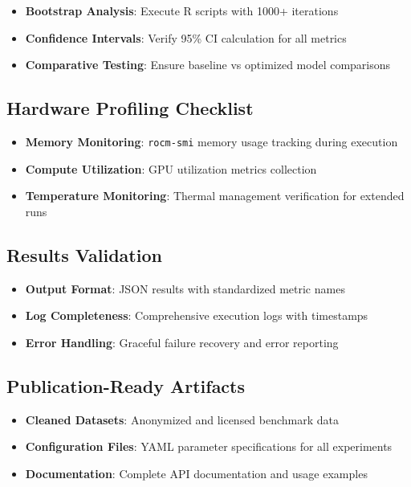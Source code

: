 \documentclass[12pt,a4paper]{article}
\begin{document}
\begin{itemize}[label=$\square$]
\item \textbf{Bootstrap Analysis}: Execute R scripts with 1000+ iterations
\item \textbf{Confidence Intervals}: Verify 95\% CI calculation for all metrics
\item \textbf{Comparative Testing}: Ensure baseline vs optimized model comparisons
\end{itemize}

\subsection{Hardware Profiling Checklist}

\begin{itemize}[label=$\square$]
\item \textbf{Memory Monitoring}: \texttt{rocm-smi} memory usage tracking during execution
\item \textbf{Compute Utilization}: GPU utilization metrics collection
\item \textbf{Temperature Monitoring}: Thermal management verification for extended runs
\end{itemize}

\subsection{Results Validation}

\begin{itemize}[label=$\square$]
\item \textbf{Output Format}: JSON results with standardized metric names
\item \textbf{Log Completeness}: Comprehensive execution logs with timestamps
\item \textbf{Error Handling}: Graceful failure recovery and error reporting
\end{itemize}

\subsection{Publication-Ready Artifacts}

\begin{itemize}[label=$\square$]
\item \textbf{Cleaned Datasets}: Anonymized and licensed benchmark data
\item \textbf{Configuration Files}: YAML parameter specifications for all experiments
\item \textbf{Documentation}: Complete API documentation and usage examples
\end{itemize}
\end{document}
